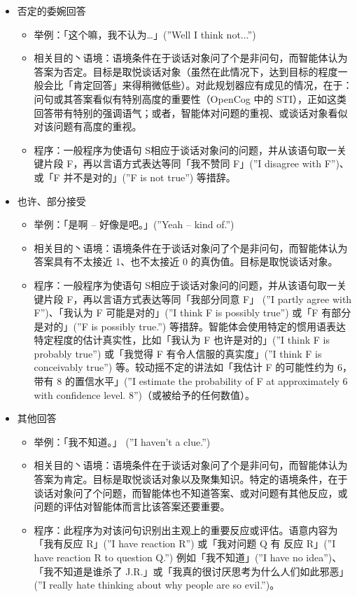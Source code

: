 \begin{itemize}
\item 否定的委婉回答
\begin{itemize}
\item 举例：「这个嘛，我不认为…」(”Well I think not...”)
\item 相关目的丶语境：语境条件在于谈话对象问了个是非问句，而智能体认为答案为否定。目标是取悦谈话对象（虽然在此情况下，达到目标的程度一般会比「肯定回答」来得稍微低些）。对此规划器应有成见的情况，在于：问句或其答案看似有特别高度的重要性（OpenCog 中的 STI），正如这类回答带有特别的强调语气；或者，智能体对问题的重视、或谈话对象看似对该问题有高度的重视。
\item 程序：一般程序为使语句 S相应于谈话对象问的问题，并从该语句取一关键片段 F，再以言语方式表达等同「我不赞同 F」(”I disagree with F”)、或「F 并不是对的」(”F is not true”) 等措辞。
\end{itemize}


\item 也许、部分接受
\begin{itemize}
\item 举例：「是啊 – 好像是吧。」(”Yeah – kind of.”)
\item 相关目的丶语境：语境条件在于谈话对象问了个是非问句，而智能体认为答案具有不太接近 1、也不太接近 0 的真伪值。目标是取悦谈话对象。 
\item 程序：一般程序为使语句 S相应于谈话对象问的问题，并从该语句取一关键片段 F，再以言语方式表达等同「我部分同意 F」 (”I partly agree with F”)、「我认为 F 可能是对的」(”I think F is possibly true”) 或「F 有部分是对的」(”F is possibly true.”) 等措辞。智能体会使用特定的惯用语表达特定程度的估计真实性，比如「我认为 F 也许是对的」(”I think F is probably true”) 或「我觉得 F 有令人信服的真实度」(”I think F is conceivably true”) 等。较动摇不定的讲法如「我估计 F 的可能性约为 6，带有 8 的置信水平」(”I estimate the probability of F at approximately 6 with confidence level. 8”)（或被给予的任何数值）。
\end{itemize}


\item 其他回答
\begin{itemize}
\item 举例：「我不知道。」 (”I haven’t a clue.”) 
\item 相关目的丶语境：语境条件在于谈话对象问了个是非问句，而智能体认为答案为肯定。目标是取悦谈话对象以及聚集知识。特定的语境条件，在于谈话对象问了个问题，而智能体也不知道答案、或对问题有其他反应，或问题的评估对智能体而言比该答案还要重要。
\item 程序：此程序为对该问句识别出主观上的重要反应或评估。语意内容为「我有反应 R」(”I have reaction R”) 或「我对问题 Q 有 反应 R」(”I have reaction R to question Q.”) 例如「我不知道」(”I have no idea”)、「我不知道是谁杀了 J.R.」或「我真的很讨厌思考为什么人们如此邪恶」(”I really hate thinking about why people are so evil.”)。
\end{itemize}



\end{itemize}
